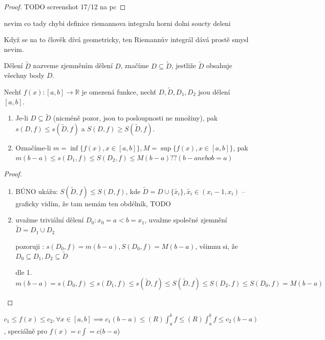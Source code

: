 \begin{proof}
  TODO screenshot 17/12 na pc
\end{proof}
 nevim co tady chybi definice riemannova integralu horni dolni soucty deleni

 \begin{poznamka}
   Když se na to člověk dívá geometricky, ten Riemannův integrál dává prostě smysl nevim.
 \end{poznamka}

\begin{definice}
  Dělení $\tilde{D}$ nazveme zjemněním dělení $D$, značíme $D \subseteq \tilde{D}$, jestliže $\tilde{D}$ obsahuje všechny body $D$.
\end{definice}

\begin{lemma}[9.1.]
  Nechť $f(x):[a,b] \to \mathbb R$ je omezená funkce, nechť $D, \tilde{D}, D_1, D_2$ jsou dělení $[a,b]$.
  \begin{enumerate}[1.]
    \item Je-li $D \subseteq \tilde{D}$ (nicméně pozor, jsou to posloupnosti ne množiny), pak $s(D, f) \leq s(\tilde{D}, f)$ a $S(D, f) \geq S(\tilde{D}, f)$.
    \item Označíme-li $m = \inf \{f(x), x  \in [a, b]\}, M = \sup \{f(x), x \in [a,b]\}$, pak $m(b-a) \leq s(D_1, f) \leq S(D_2, f) \leq M(b-a)?? (b-a nebo b=a)$
  \end{enumerate}
\end{lemma}

\begin{proof}
  \begin{enumerate}[1.]
    \item BÚNO ukážu: $S(\tilde{D}, f) \leq S(D, f)$, kde $\tilde{D} = D \cup \{\tilde{x_i}\}, \tilde{x_i} \in (x_i-1, x_i)$ -- graficky vidím, že tam nemám ten obdélník, TODO
    \item uvažme triviální dělení $D_0: x_0 = a <b = x_1$, uvažme společné zjemnění $\tilde{D} = D_1 \cup D_2$

    pozoruji : $s(D_0, f) = m(b-a), S(D_0, f) = M(b-a)$, všimnu si, že $D_0 \subseteq D_1, D_2 \subseteq \tilde{D}$

    dle 1. $m(b-a) = s(D_0, f) \leq s(D_1, f) \leq s(\tilde{D}, f) \leq S(\tilde{D}, f) \leq S(D_2, f) \leq S(D_0, f) = M(b-a)$
  \end{enumerate}
\end{proof}

\begin{dusledek}
  $c_1 \leq f(x) \leq c_2, \forall x \in [a,b] \implies c_1(b-a) \leq (R)\int_{\underline a}^b f \leq (R)\int_{a}^{\underline b} f \leq c_2(b-a)$, speciálně pro $f(x)=c \int = c(b-a$)
\end{dusledek}

